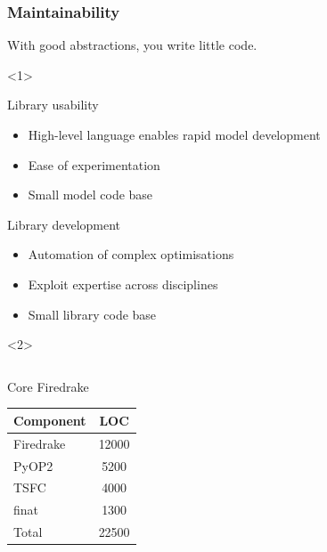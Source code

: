 \documentclass[presentation]{beamer}
\begin{document}
\begin{frame}
  \frametitle{Maintainability}
  With good abstractions, you write little code.
  \begin{overlayarea}{\textwidth}{0.8\textheight}
    \begin{onlyenv}<1>
      \begin{block}{Library usability}
        \begin{itemize}
        \item High-level language enables rapid model development
        \item Ease of experimentation
        \item Small model code base
        \end{itemize}
      \end{block}

      \begin{block}{Library development}
        \begin{itemize}
        \item Automation of complex optimisations
        \item Exploit expertise across disciplines
        \item Small library code base
        \end{itemize}
      \end{block}
    \end{onlyenv}
    \begin{onlyenv}<2>
      \begin{columns}
        \begin{column}[t]{0.5\textwidth}
          \begin{block}{Core Firedrake}
            \begin{table}
              \centering
              \begin{tabular}{lc}
                Component & LOC   \\
                \hline
                Firedrake & 12000 \\
                PyOP2     & 5200  \\
                TSFC      & 4000  \\
                finat     & 1300   \\
                \hline
                Total     & 22500
              \end{tabular}
            \end{table}
          \end{block}
        \end{column}

\end{columns}
\end{onlyenv}
\end{overlayarea}
\end{frame}
\end{document}
